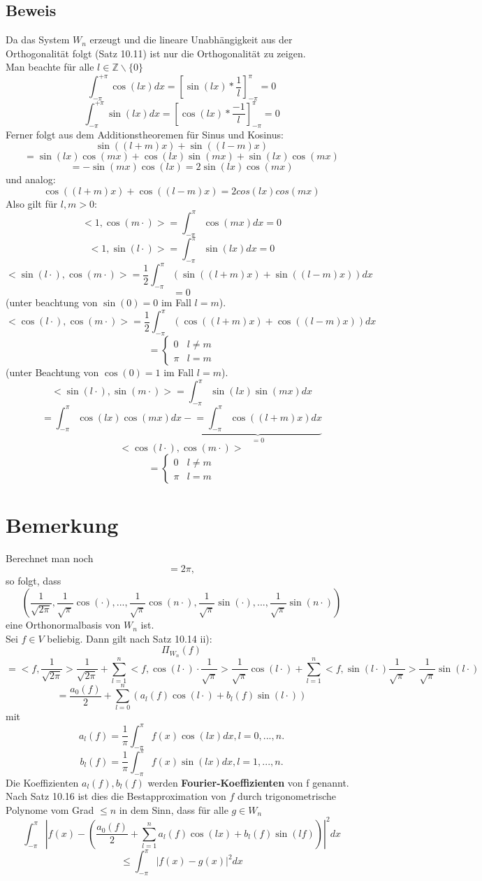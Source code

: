 \documentclass{scrbook}
\begin{document}
\subsection*{Beweis}
Da das System $W_n$ erzeugt und die lineare Unabhängigkeit aus der Orthogonalität folgt (Satz 10.11) ist nur die Orthogonalität zu zeigen.\\
Man beachte für alle $l \in \mathbb{Z} \backslash \{0\}$
\[\int^{+\pi}_{-\pi} \cos(lx)dx = [\sin(lx) * \frac{1}{l}]^\pi_{-\pi} = 0\]
\[\int^{+\pi}_{-\pi} \sin(lx)dx = [\cos(lx) * \frac{-1}{l}]^\pi_{-\pi} = 0\]
Ferner folgt aus dem Additionstheoremen für Sinus und Kosinus:
\[\sin((l+m)x) + \sin ((l-m)x)\]
\[= \sin(lx) \cos(mx) + \cos(lx) \sin(mx) + \sin(lx) \cos(mx) \]
\[=-\sin(mx) \cos(lx) = 2\sin(lx) \cos(mx)\]
und analog:
\[ \cos((l+m)x) + \cos((l-m)x) = 2 cos(lx)cos(mx)\]
Also gilt für $l,m >0$:
\[<1,\cos(m \cdot)> = \int^\pi_{-\pi} \cos(mx)dx = 0\]
\[<1,\sin(l \cdot)> = \int^\pi_{-\pi} \sin(lx)dx = 0\]
\[<\sin(l \cdot),\cos(m \cdot)> = 
\frac{1}{2} \int^{\pi}_{-\pi}(\sin((l+m)x)+\sin((l-m)x))dx\]
\[ = 0 \]
(unter beachtung von $\sin(0) = 0$ im Fall $l=m$).
\[<\cos(l\cdot),\cos(m\cdot)> = \frac{1}{2} \int^\pi_{-\pi} (\cos((l+m)x) + \cos((l-m)x) )dx\]
\[= \left\{ 
\begin{array}{cl}
0 & l\neq m\\
\pi & l=m
\end{array}
\right.\]
(unter Beachtung von $\cos(0) = 1$ im Fall $l=m$).
\[<\sin(l\cdot),\sin(m\cdot)> =\int^\pi_{-\pi} \sin(lx) \sin(mx) dx\]
\[=\int^\pi_{-\pi} \cos(lx) \cos(mx) dx - \underbrace{=\int^\pi_{-\pi} \cos((l+m)x) dx}_{=0}\]
\[<\cos(l\cdot), \cos(m\cdot)>\]
\[= \left\{ 
\begin{array}{cl}
0 & l\neq m\\
\pi & l=m
\end{array}
\right.\]
\section{Bemerkung}
Berechnet man noch
\[<1,1> = 2\pi,\]
so folgt, dass
\[(\frac{1}{\sqrt{2\pi}}, \frac{1}{
\sqrt{\pi}} \cos(\cdot),...,\frac{1}{\sqrt{\pi}}\cos(n\cdot),\frac{1}{\sqrt{\pi}}\sin(\cdot),..., \frac{1}{\sqrt{\pi}} \sin(n\cdot))\]
eine Orthonormalbasis von $W_n$ ist.\\
Sei $f\in V$ beliebig. Dann gilt nach Satz 10.14 ii):
\[\Pi_{W_n}(f)\] \[= <f, \frac{1}{\sqrt{2\pi}}>\frac{1}{\sqrt{2\pi}} + \sum^n_{l=1}<f,\cos(l\cdot)\cdot \frac{1}{\sqrt{\pi}}> \frac{1}{\sqrt{\pi}}\cos(l\cdot) + \sum^n_{l=1}<f,\sin(l\cdot)\frac{1}{\sqrt{\pi}}>\frac{1}{\sqrt{\pi}}\sin(l\cdot)\]\[ = \frac{a_0(f)}{2} + \sum^n_{l=0} (a_l(f)\cos(l\cdot)+ b_l(f)\sin(l\cdot))
\]
mit
\[
a_l(f) = \frac{1}{\pi} \int^\pi_{-\pi} f(x) \cos(lx)dx, l = 0, ...,n.\]
\[b_l(f) = \frac{1}{\pi} \int^\pi_{-\pi} f(x) \sin(lx)dx, l = 1, ...,n.
\]
Die Koeffizienten $a_l(f),b_l(f)$ werden \textbf{Fourier-Koeffizienten} von f genannt.\\
Nach Satz 10.16 ist dies die Bestapproximation von $f$ durch trigonometrische Polynome vom Grad $\leq n$ in dem Sinn, dass für alle $g \in W_n$
\[
\int^\pi_{-\pi} \left| 
f(x) - \left(
\frac{a_0(f)}{2} + \sum^n_{l=1} a_l(f) \cos(lx) + b_l (f) \sin(lf)
\right)
\right|^2 dx
\]
\[
\leq \int^\pi_{-\pi} |f(x) -g(x)| ^2 dx
\]
\end{document}

